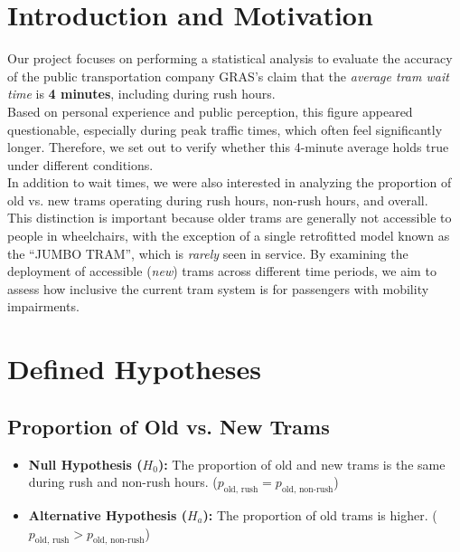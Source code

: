 \documentclass[a4paper, 10pt]{article}
\begin{document}
	\tableofcontents
	\pagebreak
	
	\section{Introduction and Motivation}
		Our project focuses on performing a statistical analysis to evaluate the accuracy of the public transportation company GRAS's claim that the 
		\emph{average tram wait time} is \textbf{4 minutes}, including during rush hours. \\

		\noindent Based on personal experience and public perception, this figure appeared questionable, especially during peak traffic times, 
		which often feel significantly longer. Therefore, we set out to verify whether this 4-minute average holds true under different conditions. \\

		\noindent In addition to wait times, we were also interested in analyzing the proportion of old vs. new trams operating during rush hours, 
		non-rush hours, and overall. \\
		
		\noindent This distinction is important because older trams are generally not accessible 
		to people in wheelchairs, with the exception of a single retrofitted model known as the “JUMBO TRAM”, 
		which is \emph{rarely} seen in service. By examining the deployment of accessible (\emph{new}) trams across different time periods, we aim to assess how inclusive the current tram system is for passengers with mobility impairments.

	\section{Defined Hypotheses}
		\subsection{Proportion of Old vs. New Trams}
			\label{sec:proportion_hypothesis}
			\begin{itemize}
					\item \textbf{Null Hypothesis ($H_0$):} The proportion of old and new trams is the same during rush and non-rush hours. ($p_{\text{old, rush}} = p_{\text{old, non-rush}}$)
					\item \textbf{Alternative Hypothesis ($H_a$):} The proportion of old trams is higher. ($p_{\text{old, rush}} > p_{\text{old, non-rush}}$)
			\end{itemize}
\end{document}
